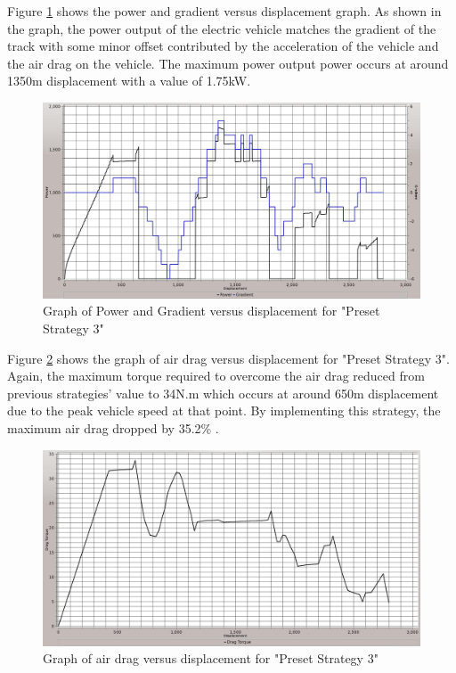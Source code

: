 Figure \ref{im:3_2} shows the power and gradient versus displacement graph. As shown in the graph, the power output of the electric vehicle matches the gradient of the track with some minor offset contributed by the acceleration of the vehicle and the air drag on the vehicle. The maximum power output power occurs at around 1350m displacement with a value of 1.75kW. 

\begin{figure}[htb]
	\centering
	\includegraphics[width=6in]{images/3_2.jpg}
	\caption{Graph of Power and Gradient versus displacement for "Preset Strategy 3"}
	\label{im:3_2}
\end{figure}

Figure \ref{im:3_3} shows the graph of air drag versus displacement for "Preset Strategy 3". Again, the maximum torque required to overcome the air drag reduced from previous strategies' value to 34N.m which occurs at around 650m displacement due to the peak vehicle speed at that point. By implementing this strategy, the maximum air drag dropped by 35.2\% .

\begin{figure}[htb]
	\centering
	\includegraphics[width=6in]{images/3_3.jpg}
	\caption{Graph of air drag versus displacement for "Preset Strategy 3"}
	\label{im:3_3}
\end{figure}

